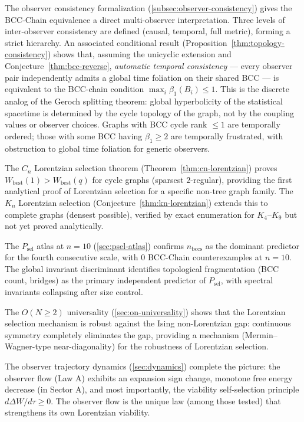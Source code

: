 \documentclass[11pt]{article}
\theoremstyle{definition}
\theoremstyle{remark}
\newcommand{\betti}{\beta_1}
\begin{document}
The observer consistency formalization
(\cref{subsec:observer-consistency}) gives the BCC-Chain equivalence a direct
multi-observer interpretation.  Three levels of inter-observer consistency
are defined (causal, temporal, full metric), forming a strict hierarchy.
An associated conditional result (Proposition~\ref{thm:topology-consistency})
shows that, assuming the unicyclic extension and
Conjecture~\ref{thm:bcc-reverse}, \emph{automatic temporal consistency} ---
every observer pair independently admits a global time foliation on their
shared BCC --- is equivalent to the BCC-chain condition
$\max_i \betti(B_i) \leq 1$.  This is the discrete
analog of the Geroch splitting theorem: global hyperbolicity of the
statistical spacetime is determined by the cycle topology of the graph,
not by the coupling values or observer choices.  Graphs with BCC cycle
rank $\leq 1$ are temporally ordered; those with some BCC having
$\betti \geq 2$ are temporally frustrated, with obstruction to global time
foliation for generic observers.

The $C_n$ Lorentzian selection theorem
(Theorem~\ref{thm:cn-lorentzian}) proves
$W_{\mathrm{best}}(1) > W_{\mathrm{best}}(q)$ for cycle graphs
(sparsest $2$-regular), providing the first analytical proof of
Lorentzian selection for a specific non-tree graph family.
The $K_n$ Lorentzian selection
(Conjecture~\ref{thm:kn-lorentzian}) extends this to complete graphs
(densest possible), verified by exact enumeration for $K_4$--$K_9$
but not yet proved analytically.

The $P_{\mathrm{sel}}$ atlas at $n = 10$ (\cref{sec:psel-atlas})
confirms $n_{\mathrm{bccs}}$ as the dominant predictor for the fourth
consecutive scale, with $0$ BCC-Chain counterexamples at $n = 10$.
The global invariant discriminant identifies topological fragmentation
(BCC count, bridges) as the primary independent predictor of $P_{\mathrm{sel}}$,
with spectral invariants collapsing after size control.

The $O(N \geq 2)$ universality (\cref{sec:on-universality}) shows
that the Lorentzian selection mechanism is robust against the Ising
non-Lorentzian gap: continuous symmetry completely eliminates the gap,
providing a mechanism (Mermin--Wagner-type near-diagonality)
for the robustness of Lorentzian selection.

The observer trajectory dynamics (\cref{sec:dynamics}) complete the
picture: the observer flow (Law A) exhibits an expansion sign change,
monotone free energy decrease (in Sector A), and most importantly, the
viability self-selection principle $d\Delta W/d\tau \geq 0$. The
observer flow is the unique law (among those tested) that strengthens
its own Lorentzian viability.
\end{document}
